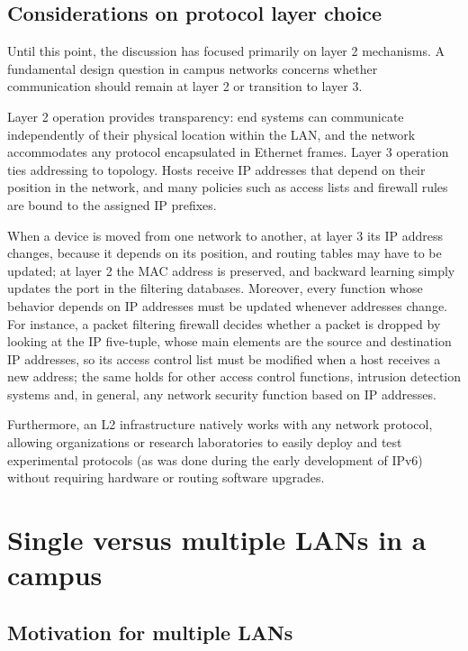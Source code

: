 \documentclass[11pt,a4paper,openany]{report}
\begin{document}
\subsection{Considerations on protocol layer choice}

Until this point, the discussion has focused primarily on layer 2 mechanisms. A fundamental design question in campus networks concerns whether communication should remain at layer 2 or transition to layer 3.

Layer 2 operation provides transparency: end systems can communicate independently of their physical location within the LAN, and the network accommodates any protocol encapsulated in Ethernet frames. Layer 3 operation ties addressing to topology. Hosts receive IP addresses that depend on their position in the network, and many policies such as access lists and firewall rules are bound to the assigned IP prefixes.

When a device is moved from one network to another, at layer 3 its IP address changes, because it depends on its position, and routing tables may have to be updated; at layer 2 the MAC address is preserved, and backward learning simply updates the port in the filtering databases. Moreover, every function whose behavior depends on IP addresses must be updated whenever addresses change. For instance, a packet filtering firewall decides whether a packet is dropped by looking at the IP five-tuple, whose main elements are the source and destination IP addresses, so its access control list must be modified when a host receives a new address; the same holds for other access control functions, intrusion detection systems and, in general, any network security function based on IP addresses.


Furthermore, an L2 infrastructure natively works with any network protocol, allowing organizations or research laboratories to easily deploy and test experimental protocols (as was done during the early development of IPv6) without requiring hardware or routing software upgrades.

\section{Single versus multiple LANs in a campus}

\subsection{Motivation for multiple LANs}
\end{document}
